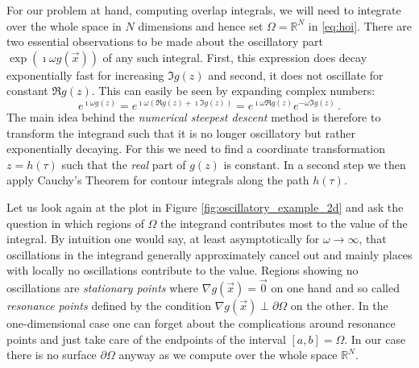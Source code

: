 \documentclass[a4paper,10pt]{article}
\begin{document}
For our problem at hand, computing overlap integrals, we will need to integrate
over the whole space in $N$ dimensions and hence set $\Omega = \mathbb{R}^N$ in
\eqref{eq:hoi}.
There are two essential observations to be made about the
oscillatory part $\exp\left(\imath \omega g\left(\vec{x}\right) \right)$
of any such integral. First, this expression does decay exponentially
fast for increasing $\Im g(z)$ and second, it does not oscillate for
constant $\Re g(z)$. This can easily be seen by expanding complex numbers:
\begin{equation*}
  e^{\imath \omega g(z)}
  =
  e^{\imath \omega (\Re g(z) + \imath \Im g(z))}
  =
  e^{\imath \omega \Re g(z)}
  e^{- \omega \Im g(z)} \,.
\end{equation*}
The main idea behind the \emph{numerical steepest descent} method is therefore
to transform the integrand such that it is no longer oscillatory but
rather exponentially decaying. For this we need to find a coordinate
transformation $z = h(\tau)$ such that the \emph{real} part of $g(z)$
is constant. In a second step we then apply Cauchy's Theorem for contour
integrals along the path $h(\tau)$.

Let us look again at the plot in Figure \ref{fig:oscillatory_example_2d}
and ask the question in which regions of $\Omega$ the integrand contributes most
to the value of the integral. By intuition one would say, at least asymptotically
for $\omega \rightarrow \infty$, that oscillations in the integrand generally approximately
cancel out and mainly places with locally no oscillations contribute to the value.
Regions showing no oscillations are \emph{stationary points} where
$\nabla g(\vec{x}) = \vec{0}$ on one hand and so called \emph{resonance points}
defined by the condition $\nabla g(\vec{x}) \perp \partial \Omega$ on the other.
In the one-dimensional case one can forget about the complications around resonance
points and just take care of the endpoints of the interval $[a, b] = \Omega$. In our
case there is no surface $\partial \Omega$ anyway as we compute over the whole space
$\mathbb{R}^N$.
\end{document}
